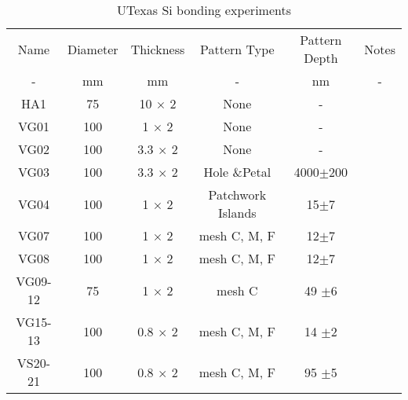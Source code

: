 \begin{table}[h!]
\caption{UTexas Si bonding experiments \label{tabbondexper}}
\begin{center}
    \begin{tabular}{ c c c c c c}
    \hline
    Name & Diameter & Thickness & Pattern Type & Pattern Depth & Notes \\ 
    -  & mm & mm & - & nm & - \\
        \hline
    HA1     & 75   & 10 $\times$ 2& None & - & \\
    VG01   & 100 & 1 $\times$ 2 & None  & - &  \\
    VG02   & 100 & 3.3 $\times$ 2 &  None  & - &  \\
    VG03   & 100 & 3.3 $\times$ 2 &  Hole \&Petal & 4000$\pm$200 & \\
    VG04   & 100 & 1 $\times$ 2 &  Patchwork Islands & 15$\pm7$ & \\
    VG07   & 100 & 1 $\times$ 2 &  mesh C, M, F & 12$\pm7$ & \\ %
    VG08   & 100 & 1 $\times$ 2 &  mesh C, M, F & 12$\pm7$ & \\
    VG09-12   & 75   & 1 $\times$ 2 & mesh C & 49 $\pm$6 & \\
    VG15-13   & 100 & 0.8 $\times$ 2 &  mesh C, M, F  &14 $\pm$2 & \\
    VS20-21   & 100 & 0.8 $\times$ 2 &  mesh C, M, F & 95 $\pm$5 & \\
    \hline
    \end{tabular}
\end{center}
\end{table}